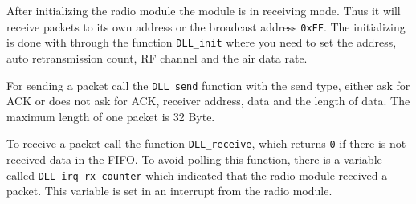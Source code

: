 \documentclass[11pt]{article}
\begin{document}
   After initializing the radio module the module is in receiving mode. Thus it will receive packets to its own address or the broadcast address \texttt{0xFF}. The initializing is done with through the function \texttt{DLL\_init} where you need to set the address, auto retransmission count, RF channel and the air data rate.
   
   For sending a packet call the \texttt{DLL\_send} function with the send type, either ask for ACK or does not ask for ACK, receiver address, data and the length of data. The maximum length of one packet is 32 Byte.
   
   To receive a packet call the function \texttt{DLL\_receive}, which returns \texttt{0} if there is not received data in the FIFO. To avoid polling this function, there is a variable called \texttt{DLL\_irq\_rx\_counter} which indicated that the radio module received a packet. This variable is set in an interrupt from the radio module.
\end{document}
